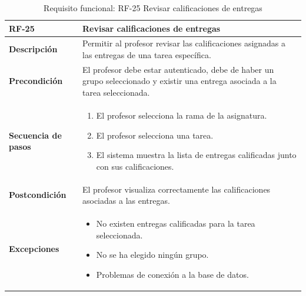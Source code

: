 \begin{table}[H]
\centering
\begin{tabularx}{\textwidth}{
  |>{\centering\arraybackslash}l
  |>{\centering\arraybackslash}X|}
\hline
\textbf{RF-25} & \textbf{Revisar calificaciones de entregas} \\ \hline

\textbf{Descripción} & Permitir al profesor revisar las calificaciones asignadas a las entregas de una tarea específica. \\ \hline

\textbf{Precondición} & El profesor debe estar autenticado, debe de haber un grupo seleccionado y existir una entrega asociada a la tarea seleccionada. \\ \hline

\textbf{Secuencia de pasos} &
\begin{enumerate}
  \item El profesor selecciona la rama de la asignatura.
  \item El profesor selecciona una tarea.
  \item El sistema muestra la lista de entregas calificadas junto con sus calificaciones.
\end{enumerate} \\ \hline

\textbf{Postcondición} & El profesor visualiza correctamente las calificaciones asociadas a las entregas. \\ \hline

\textbf{Excepciones} &
\begin{itemize}
  \item No existen entregas calificadas para la tarea seleccionada.
  \item No se ha elegido ningún grupo.
  \item Problemas de conexión a la base de datos.
\end{itemize} \\ \hline
\end{tabularx}
\caption{Requisito funcional: RF-25 Revisar calificaciones de entregas}
\label{tab:RF-25}
\end{table}
